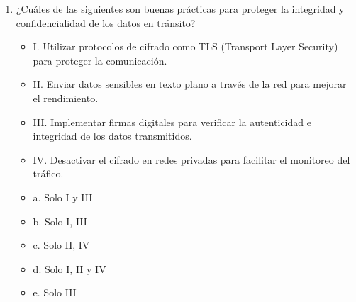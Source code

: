 \documentclass[a4paper]{article}
\begin{document}
\begin{enumerate}
    \item ¿Cuáles de las siguientes son buenas prácticas para proteger la integridad y confidencialidad de los datos en tránsito?
    \begin{itemize}
        \item I. Utilizar protocolos de cifrado como TLS (Transport Layer Security) para proteger la comunicación.
        \item II. Enviar datos sensibles en texto plano a través de la red para mejorar el rendimiento.
        \item III. Implementar firmas digitales para verificar la autenticidad e integridad de los datos transmitidos.
        \item IV. Desactivar el cifrado en redes privadas para facilitar el monitoreo del tráfico.
    \end{itemize}
    \begin{itemize}
        \item a. Solo I y III
        \item b. Solo I, III 
        \item c. Solo II, IV 
        \item d. Solo I, II y IV
        \item e. Solo III 
    \end{itemize}

\end{enumerate}
\end{document}
